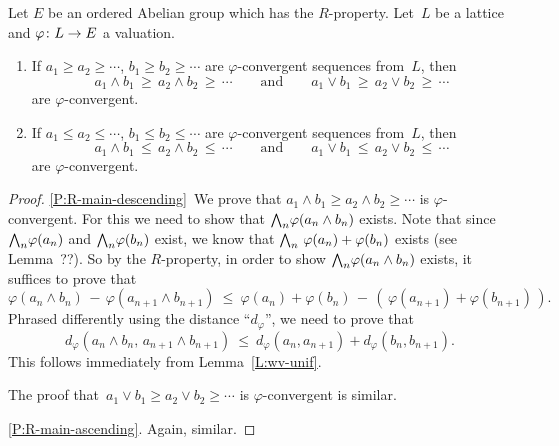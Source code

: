 \documentclass[main.tex]{subfiles}
\begin{document}
\begin{prop}
\label{P:R-main}
Let  $E$ be an ordered Abelian group which
has the $R$-property.
Let~$L$ be a lattice and $\varphi\colon L \rightarrow E$ a valuation.
\begin{enumerate}
\item
\label{P:R-main-descending}
If  $a_1 \geq a_2 \geq \dotsb$,
$b_1 \geq b_2 \geq \dotsb$
are  $\varphi$-convergent
sequences from~$L$,
then
\begin{equation*}
a_1 \wedge b_1 \,\geq\, a_2 \wedge b_2 \,\geq\, \dotsb
\qquad\text{and}\qquad
a_1 \vee b_1 \,\geq\, a_2 \vee b_2 \,\geq\, \dotsb
\end{equation*}
are $\varphi$-convergent.

\item
\label{P:R-main-ascending}
If  $a_1 \leq a_2 \leq \dotsb$,
$b_1 \leq b_2 \leq \dotsb$
are  $\varphi$-convergent
sequences from~$L$,
then
\begin{equation*}
a_1 \wedge b_1 \,\leq\, a_2 \wedge b_2 \,\leq\, \dotsb
\qquad\text{and}\qquad
a_1 \vee b_1 \,\leq\, a_2 \vee b_2 \,\leq\, \dotsb
\end{equation*}
are $\varphi$-convergent.
\end{enumerate}
\end{prop}
\begin{proof}
\ref{P:R-main-descending}\ 
We prove that $a_1 \wedge b_1 \geq a_2 \wedge b_2 \geq\dotsb$
is $\varphi$-convergent.
For this we need to show that $\textstyle{\bigwedge}_n \varphi(a_n\wedge b_n)$ exists.
Note that since $\textstyle{\bigwedge}_n \varphi (a_n)$
and $\textstyle{\bigwedge}_n \varphi(b_n)$ exist,
we know that $\textstyle{\bigwedge}_n \ \varphi(a_n) + \varphi(b_n)$
exists (see Lemma~??).
So by the $R$-property,
in order to show $\textstyle{\bigwedge}_n\varphi(a_n \wedge b_n)$ exists,
it suffices to prove that 
\begin{equation*}
\varphi(a_{n}\wedge b_{n}) \,-\, \varphi(a_{n+1} \wedge b_{n+1}) 
\ \leq\ 
\varphi(a_{n}) + \varphi(b_{n}) \,-\, (\,\varphi(a_{n+1}) + \varphi(b_{n+1})\,).
\end{equation*}
Phrased differently
using the distance ``$d_\varphi$'',
we need to prove that
\begin{equation*}
d_\varphi(a_{n}\wedge b_{n},\, a_{n+1} \wedge b_{n+1}) 
\ \leq\ 
d_\varphi(a_{n},a_{n+1}) + d_\varphi(b_{n},b_{n+1}).
\end{equation*}
This follows immediately from Lemma~\ref{L:wv-unif}.

The 
proof that~$a_1 \vee b_1 \geq a_2 \vee b_2 \geq \dotsb$
is $\varphi$-convergent is similar.

\ref{P:R-main-ascending}.  Again, similar.
\end{proof}
\end{document}
